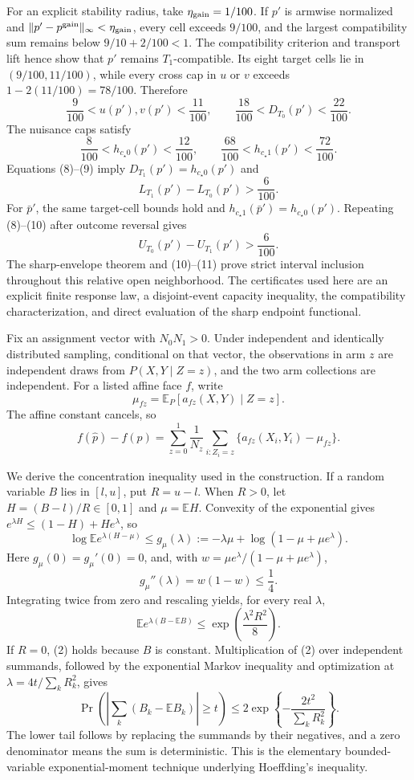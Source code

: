 For an explicit stability radius, take \(\eta_{\rm gain}=1/100\).  If
\(p'\) is armwise normalized and
\(\lVert p'-p^{\rm gain}\rVert_\infty<\eta_{\rm gain}\), every cell exceeds
\(9/100\), and the largest compatibility sum remains below
\(9/10+2/100<1\).  The compatibility criterion and transport lift hence
show that \(p'\) remains \(T_1\)-compatible.  Its eight
target cells lie in \((9/100,11/100)\), while every cross cap in \(u\) or
\(v\) exceeds \(1-2(11/100)=78/100\).  Therefore
\[
 \frac9{100}<u(p'),v(p')<\frac{11}{100},
 \qquad
 \frac{18}{100}<D_{T_0}(p')<\frac{22}{100}. \tag{8}
\]
The nuisance caps satisfy
\[
 \frac8{100}<h_{c_\star0}(p')<\frac{12}{100},
 \qquad
 \frac{68}{100}<h_{c_\star1}(p')<\frac{72}{100}. \tag{9}
\]
Equations (8)--(9) imply \(D_{T_1}(p')=h_{c_\star0}(p')\) and
\[
 L_{T_1}(p')-L_{T_0}(p')>\frac6{100}. \tag{10}
\]
For \(\bar p'\), the same target-cell bounds hold and
\(h_{c_\star1}(\bar p')=h_{c_\star0}(p')\).  Repeating (8)--(10) after
outcome reversal gives
\[
 U_{T_0}(p')-U_{T_1}(p')>\frac6{100}. \tag{11}
\]
The sharp-envelope theorem and (10)--(11) prove strict interval inclusion
throughout this relative open neighborhood.  The certificates used here
are an explicit finite response law, a disjoint-event capacity inequality,
the compatibility characterization, and direct evaluation of the sharp
endpoint functional.

Fix an assignment vector with \(N_0N_1>0\).  Under independent and
identically distributed sampling, conditional on that vector, the
observations in arm \(z\) are independent draws from
\(P(X,Y\mid Z=z)\), and the two arm collections are independent.  For a
listed affine face \(f\), write
\[
 \mu_{fz}=\mathbb E_P[a_{fz}(X,Y)\mid Z=z].
\]
The affine constant cancels, so
\[
 f(\widehat p)-f(p)
 =\sum_{z=0}^1\frac1{N_z}\sum_{i:Z_i=z}
 \{a_{fz}(X_i,Y_i)-\mu_{fz}\}. \tag{1}
\]

We derive the concentration inequality used in the construction.  If a
random variable \(B\) lies in \([l,u]\), put \(R=u-l\).  When \(R>0\), let
\(H=(B-l)/R\in[0,1]\) and \(\mu=\mathbb EH\).  Convexity of the exponential
gives \(e^{\lambda H}\le(1-H)+He^\lambda\), so
\[
 \log\mathbb E e^{\lambda(H-\mu)}
 \le g_\mu(\lambda)
 :=-\lambda\mu+\log(1-\mu+\mu e^\lambda).
\]
Here \(g_\mu(0)=g_\mu'(0)=0\), and, with
\(w=\mu e^\lambda/(1-\mu+\mu e^\lambda)\),
\[
 g_\mu''(\lambda)=w(1-w)\le\frac14.
\]
Integrating twice from zero and rescaling yields, for every real
\(\lambda\),
\[
 \mathbb E e^{\lambda(B-\mathbb EB)}
 \le\exp\!\left(\frac{\lambda^2R^2}{8}\right). \tag{2}
\]
If \(R=0\), (2) holds because \(B\) is constant.  Multiplication of (2)
over independent summands, followed by the exponential Markov inequality
and optimization at \(\lambda=4t/\sum_kR_k^2\), gives
\[
 \Pr\!\left(\left|\sum_k(B_k-\mathbb EB_k)\right|\ge t\right)
 \le2\exp\!\left\{-\frac{2t^2}{\sum_kR_k^2}\right\}. \tag{3}
\]
The lower tail follows by replacing the summands by their negatives, and a
zero denominator means the sum is deterministic.  This is the elementary
bounded-variable exponential-moment technique underlying Hoeffding's
inequality.

